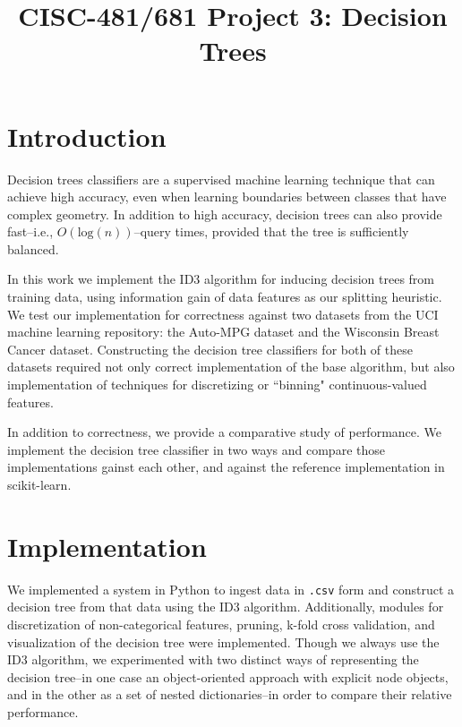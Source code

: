 \documentclass[12pt, conference, compsocconf]{IEEEtran}
\begin{document}
\title{CISC-481/681 Project 3: Decision Trees}

\author{
}

\maketitle

\section{Introduction}
Decision trees classifiers are a supervised machine learning technique that can achieve high accuracy, even when learning boundaries between classes that have complex geometry. 
In addition to high accuracy, decision trees can also provide fast--i.e., $O(\text{log}(n))$--query times, provided that the tree is sufficiently balanced. 

In this work we implement the ID3 algorithm for inducing decision trees from training data, using information gain of data features as our splitting heuristic. 
We test our implementation for correctness against two datasets from the UCI machine learning repository: the Auto-MPG dataset and the Wisconsin Breast Cancer dataset.
Constructing the decision tree classifiers for both of these datasets required not only correct implementation of the base algorithm, but also implementation of techniques for discretizing or ``binning" continuous-valued features.

In addition to correctness, we provide a comparative study of performance. 
We implement the decision tree classifier in two ways and compare those implementations gainst each other, and against the reference implementation in scikit-learn. 

\section{Implementation}
We implemented a system in Python to ingest data in \texttt{.csv} form and construct a decision tree from that data using the ID3 algorithm.
Additionally, modules for discretization of non-categorical features, pruning, k-fold cross validation, and visualization of the decision tree were implemented.
Though we always use the ID3 algorithm, we experimented with two distinct ways of representing the decision tree--in one case an object-oriented approach with explicit node objects, and in the other as a set of nested dictionaries--in order to compare their relative performance.  
\end{document}

